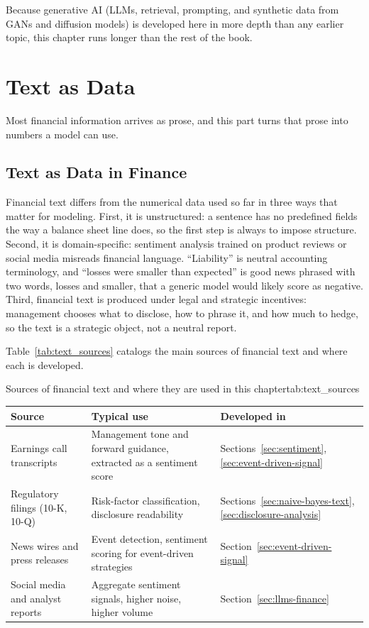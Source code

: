 \documentclass[../ai_in_finance]{subfiles}
\begin{document}
Because generative AI (LLMs, retrieval, prompting, and synthetic data from GANs and diffusion models) is developed here in more depth than any earlier topic, this chapter runs longer than the rest of the book.

\section{Text as Data}

Most financial information arrives as prose, and this part turns that prose into numbers a model can use.

\subsection{Text as Data in Finance}
\label{sec:text-data}

Financial text differs from the numerical data used so far in three ways that matter for modeling. First, it is unstructured: a sentence has no predefined fields the way a balance sheet line does, so the first step is always to impose structure. Second, it is domain-specific: sentiment analysis trained on product reviews or social media misreads financial language. ``Liability'' is neutral accounting terminology, and ``losses were smaller than expected'' is good news phrased with two words, losses and smaller, that a generic model would likely score as negative. Third, financial text is produced under legal and strategic incentives: management chooses what to disclose, how to phrase it, and how much to hedge, so the text is a strategic object, not a neutral report.

Table~\ref{tab:text_sources} catalogs the main sources of financial text and where each is developed.

\begin{booktable}[htbp]{Sources of financial text and where they are used in this chapter}{tab:text_sources}
\begin{tabular}{L{3.0cm}L{5.6cm}L{3.6cm}}
\toprule
Source & Typical use & Developed in \\
\midrule
Earnings call transcripts & Management tone and forward guidance, extracted as a sentiment score & Sections~\ref{sec:sentiment}, \ref{sec:event-driven-signal} \\
Regulatory filings (10-K, 10-Q) & Risk-factor classification, disclosure readability & Sections~\ref{sec:naive-bayes-text}, \ref{sec:disclosure-analysis} \\
News wires and press releases & Event detection, sentiment scoring for event-driven strategies & Section~\ref{sec:event-driven-signal} \\
Social media and analyst reports & Aggregate sentiment signals, higher noise, higher volume & Section~\ref{sec:llms-finance} \\
\bottomrule
\end{tabular}
\end{booktable}
\end{document}
